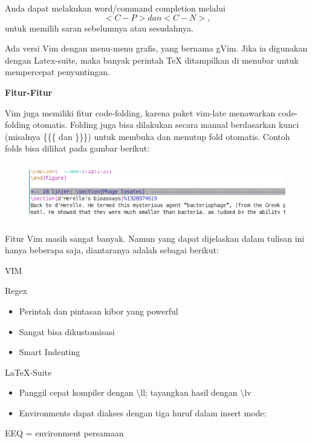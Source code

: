 \begin{enumerate}
Anda dapat melakukan word/command completion melalui
\begin{equation}
<C-P> dan <C-N>,
\end{equation}untuk memilih saran sebelumnya atau sesudahnya.

Ada versi Vim dengan menu-menu grafis, yang bernama gVim. Jika ia digunakan dengan Latex-suite, maka banyak perintah TeX ditampilkan di menubar untuk mempercepat penyuntingan.
\par \vspace{12pt}
\textbf{Fitur-Fitur}
\par \vspace{12pt}
Vim juga memiliki fitur code-folding, karena paket vim-late menawarkan code-folding otomatis. Folding juga bisa dilakukan secara manual berdasarkan kunci (misalnya \{\{\{ dan \}\}\}) untuk membuka dan menutup fold otomatis. Contoh folds bisa dilihat pada gambar berikut:

\begin{figure}[ht]

\includegraphics[width=15.12cm,height=2.54cm]{gambar/image5.jpg}
\end{figure}

Fitur Vim masih sangat banyak. Namun yang dapat dijelaskan dalam tulisan ini hanya beberapa saja, diantaranya adalah sebagai berikut:

VIM

Regex

\begin{itemize}
\item Perintah dan pintasan kibor yang powerful
\item Sangat bisa dikustomisasi
\item Smart Indenting
\end{itemize}
LaTeX-Suite

\begin{itemize}
\item Panggil cepat kompiler dengan $\setminus$ll; tayangkan hasil dengan $\setminus$lv
\item Environments dapat diakses dengan tiga huruf dalam insert mode:
\end{itemize}
\hspace{0,2in}EEQ = environment persamaan


\end{enumerate}
